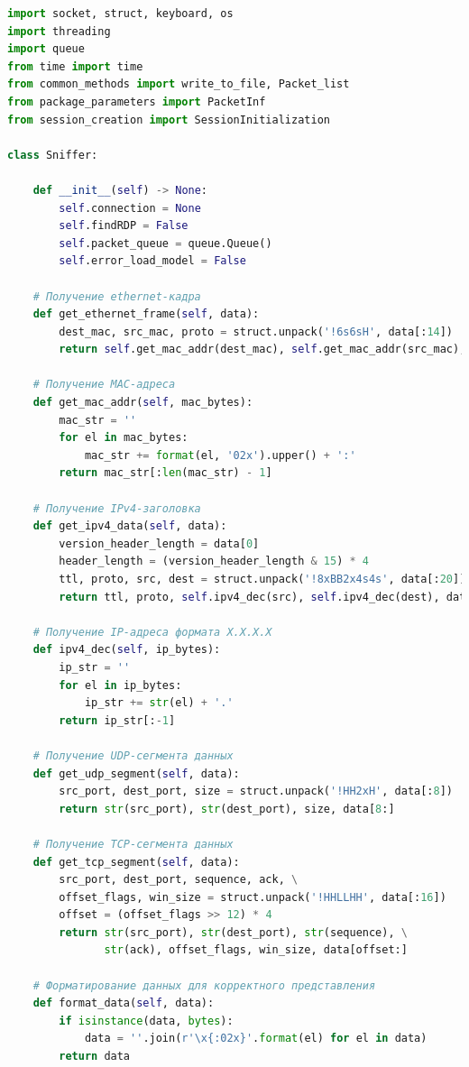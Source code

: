 \documentclass[spec, och, diploma]{SCWorks}
\begin{document}
    \begin{lstlisting}[language=Python]
import socket, struct, keyboard, os
import threading
import queue
from time import time
from common_methods import write_to_file, Packet_list
from package_parameters import PacketInf
from session_creation import SessionInitialization

class Sniffer:

    def __init__(self) -> None:
        self.connection = None
        self.findRDP = False
        self.packet_queue = queue.Queue()
        self.error_load_model = False

    # Получение ethernet-кадра
    def get_ethernet_frame(self, data):
        dest_mac, src_mac, proto = struct.unpack('!6s6sH', data[:14])
        return self.get_mac_addr(dest_mac), self.get_mac_addr(src_mac), socket.htons(proto)

    # Получение MAC-адреса
    def get_mac_addr(self, mac_bytes):
        mac_str = ''
        for el in mac_bytes:
            mac_str += format(el, '02x').upper() + ':'
        return mac_str[:len(mac_str) - 1]

    # Получение IPv4-заголовка
    def get_ipv4_data(self, data):
        version_header_length = data[0]
        header_length = (version_header_length & 15) * 4
        ttl, proto, src, dest = struct.unpack('!8xBB2x4s4s', data[:20])
        return ttl, proto, self.ipv4_dec(src), self.ipv4_dec(dest), data[header_length:]

    # Получение IP-адреса формата X.X.X.X
    def ipv4_dec(self, ip_bytes):
        ip_str = ''
        for el in ip_bytes:
            ip_str += str(el) + '.'
        return ip_str[:-1]

    # Получение UDP-сегмента данных
    def get_udp_segment(self, data):
        src_port, dest_port, size = struct.unpack('!HH2xH', data[:8])
        return str(src_port), str(dest_port), size, data[8:]

    # Получение TCP-cегмента данных
    def get_tcp_segment(self, data):
        src_port, dest_port, sequence, ack, \
        offset_flags, win_size = struct.unpack('!HHLLHH', data[:16])
        offset = (offset_flags >> 12) * 4
        return str(src_port), str(dest_port), str(sequence), \
               str(ack), offset_flags, win_size, data[offset:]

    # Форматирование данных для корректного представления
    def format_data(self, data):
        if isinstance(data, bytes):
            data = ''.join(r'\x{:02x}'.format(el) for el in data)
        return data


\end{lstlisting}
\end{document}
